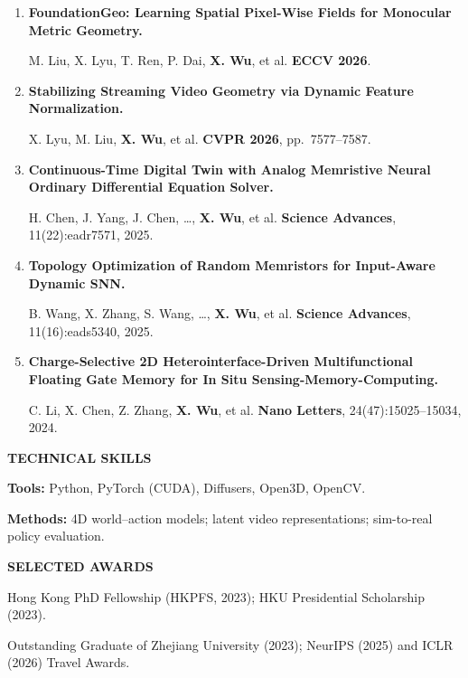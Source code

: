 \documentclass[a4paper]{article}
\newcommand{\cvsection}[1]{%
  \par\vspace{2.0pt}%
  {\color{cvblue}\fontsize{11}{12.2}\selectfont\bfseries\MakeUppercase{#1}}\par
  \vspace{-4pt}{\color{cvblue}\rule{\textwidth}{0.4pt}}\par\vspace{1.0pt}%
}
\begin{document}
{\begin{enumerate}[resume,leftmargin=1.6em,labelsep=0.38em,itemsep=0.4pt,topsep=1.3pt,parsep=0pt,partopsep=0pt]
M. Liu, T. Liu, J. Xia, X. Lyu, \textbf{X. Wu}, et al. \hfill \textbf{CoRL 2026}.
\item \textbf{FoundationGeo: Learning Spatial Pixel-Wise Fields for Monocular Metric Geometry.}\par
M. Liu, X. Lyu, T. Ren, P. Dai, \textbf{X. Wu}, et al. \hfill \textbf{ECCV 2026}.
\item \textbf{Stabilizing Streaming Video Geometry via Dynamic Feature Normalization.}\par
X. Lyu, M. Liu, \textbf{X. Wu}, et al. \hfill \textbf{CVPR 2026}, pp.\ 7577--7587.
\item \textbf{Continuous-Time Digital Twin with Analog Memristive Neural Ordinary Differential Equation Solver.}\par
H. Chen, J. Yang, J. Chen, \ldots, \textbf{X. Wu}, et al. \hfill \textbf{Science Advances}, 11(22):eadr7571, 2025.
\item \textbf{Topology Optimization of Random Memristors for Input-Aware Dynamic SNN.}\par
B. Wang, X. Zhang, S. Wang, \ldots, \textbf{X. Wu}, et al. \hfill \textbf{Science Advances}, 11(16):eads5340, 2025.
\item \textbf{Charge-Selective 2D Heterointerface-Driven Multifunctional Floating Gate Memory for In Situ Sensing-Memory-Computing.}\par
C. Li, X. Chen, Z. Zhang, \textbf{X. Wu}, et al. \hfill \textbf{Nano Letters}, 24(47):15025--15034, 2024.
\end{enumerate}}

\cvsection{Technical Skills}
\textbf{Tools:} Python, PyTorch (CUDA), Diffusers, Open3D, OpenCV.\par
\textbf{Methods:} 4D world--action models; latent video representations; sim-to-real policy evaluation.


\cvsection{Selected Awards}
Hong Kong PhD Fellowship (HKPFS, 2023); HKU Presidential Scholarship (2023).\par
Outstanding Graduate of Zhejiang University (2023); NeurIPS (2025) and ICLR (2026) Travel Awards.
\end{document}

